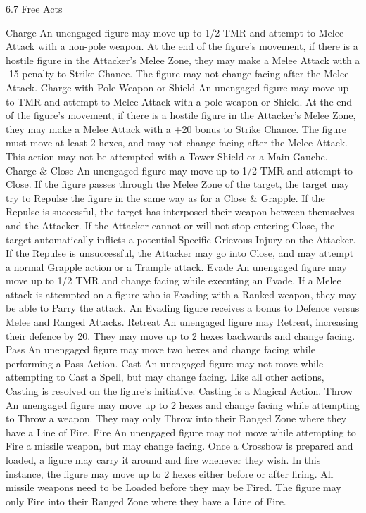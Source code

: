 \documentclass[a4paper]{article}
\begin{document}
\begin{multicols}{3}
6.7 Free Acts

Charge
An unengaged figure may move up to 1/2 TMR
and attempt to Melee Attack with a non-pole
weapon. At the end of the figure’s movement, if
there is a hostile figure in the Attacker’s Melee
Zone, they may make a Melee Attack with a -15
penalty to Strike Chance. The figure may not
change facing after the Melee Attack.
Charge with Pole Weapon or Shield
An unengaged figure may move up to TMR and
attempt to Melee Attack with a pole weapon or
Shield. At the end of the figure’s movement, if
there is a hostile figure in the Attacker’s Melee
Zone, they may make a Melee Attack with a +20
bonus to Strike Chance. The figure must move at
least 2 hexes, and may not change facing after the
Melee Attack. This action may not be attempted
with a Tower Shield or a Main Gauche.
Charge & Close
An unengaged figure may move up to 1/2 TMR
and attempt to Close. If the figure passes through
the Melee Zone of the target, the target may try to
Repulse the figure in the same way as for a Close
& Grapple.
If the Repulse is successful, the target has interposed their weapon between themselves and the
Attacker. If the Attacker cannot or will not stop
entering Close, the target automatically inflicts a
potential Specific Grievous Injury on the Attacker.
If the Repulse is unsuccessful, the Attacker may go
into Close, and may attempt a normal Grapple
action or a Trample attack.
Evade
An unengaged figure may move up to 1/2 TMR
and change facing while executing an Evade. If a
Melee attack is attempted on a figure who is Evading with a Ranked weapon, they may be able to
Parry the attack. An Evading figure receives a
bonus to Defence versus Melee and Ranged Attacks.
Retreat
An unengaged figure may Retreat, increasing their
defence by 20. They may move up to 2 hexes
backwards and change facing.
Pass
An unengaged figure may move two hexes and
change facing while performing a Pass Action.
Cast
An unengaged figure may not move while attempting to Cast a Spell, but may change facing. Like all
other actions, Casting is resolved on the figure’s
initiative. Casting is a Magical Action.
Throw
An unengaged figure may move up to 2 hexes and
change facing while attempting to Throw a
weapon. They may only Throw into their Ranged
Zone where they have a Line of Fire.
Fire
An unengaged figure may not move while attempting to Fire a missile weapon, but may change facing. Once a Crossbow is prepared and loaded, a
figure may carry it around and fire whenever they
wish. In this instance, the figure may move up to 2
hexes either before or after firing. All missile
weapons need to be Loaded before they may be
Fired. The figure may only Fire into their Ranged
Zone where they have a Line of Fire.


\end{multicols}
\end{document}
